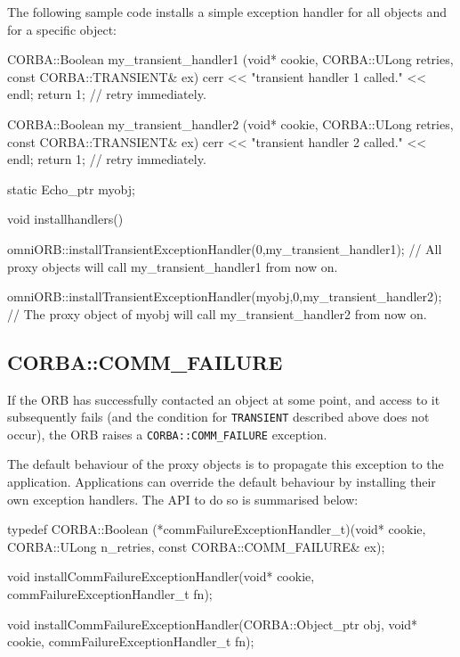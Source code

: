 \documentclass[11pt,twoside,a4paper]{book}
\newcommand{\code}[1]{\texttt{#1}}
\newcommand{\dsc}{\discretionary{}{}{}}
\begin{document}
The following sample code installs a simple exception handler for all
objects and for a specific object:

\begin{cxxlisting}
CORBA::Boolean my_transient_handler1 (void* cookie,
                                      CORBA::ULong retries,
                                      const CORBA::TRANSIENT& ex)
{
   cerr << "transient handler 1 called." << endl;
   return 1;           // retry immediately.
}
 
CORBA::Boolean my_transient_handler2 (void* cookie,
                                      CORBA::ULong retries,
                                      const CORBA::TRANSIENT& ex)
{
   cerr << "transient handler 2 called." << endl;
   return 1;           // retry immediately.
}


static Echo_ptr myobj;

void installhandlers()
{
   omniORB::installTransientExceptionHandler(0,my_transient_handler1);
   // All proxy objects will call my_transient_handler1 from now on.

   omniORB::installTransientExceptionHandler(myobj,0,my_transient_handler2);
   // The proxy object of myobj will call my_transient_handler2 from now on.
}
\end{cxxlisting}


\subsection{CORBA::COMM\_FAILURE}

If the ORB has successfully contacted an object at some point, and
access to it subsequently fails (and the condition for
\code{TRANSIENT} described above does not occur), the ORB raises a
\code{CORBA::COMM\_\dsc{}FAILURE} exception.

The default behaviour of the proxy objects is to propagate this
exception to the application. Applications can override the default
behaviour by installing their own exception handlers. The API to do so
is summarised below:

\begin{cxxlisting}
typedef CORBA::Boolean
(*commFailureExceptionHandler_t)(void* cookie,
                                 CORBA::ULong n_retries,
                                 const CORBA::COMM_FAILURE& ex);

void
installCommFailureExceptionHandler(void* cookie,
                                   commFailureExceptionHandler_t fn);

void
installCommFailureExceptionHandler(CORBA::Object_ptr obj,
                                   void* cookie,
                                   commFailureExceptionHandler_t fn);
\end{cxxlisting}
\end{document}
